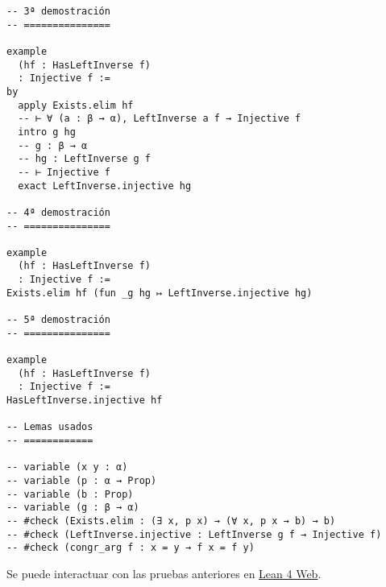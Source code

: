 \begin{verbatim}
-- 3ª demostración
-- ===============

example
  (hf : HasLeftInverse f)
  : Injective f :=
by
  apply Exists.elim hf
  -- ⊢ ∀ (a : β → α), LeftInverse a f → Injective f
  intro g hg
  -- g : β → α
  -- hg : LeftInverse g f
  -- ⊢ Injective f
  exact LeftInverse.injective hg

-- 4ª demostración
-- ===============

example
  (hf : HasLeftInverse f)
  : Injective f :=
Exists.elim hf (fun _g hg ↦ LeftInverse.injective hg)

-- 5ª demostración
-- ===============

example
  (hf : HasLeftInverse f)
  : Injective f :=
HasLeftInverse.injective hf

-- Lemas usados
-- ============

-- variable (x y : α)
-- variable (p : α → Prop)
-- variable (b : Prop)
-- variable (g : β → α)
-- #check (Exists.elim : (∃ x, p x) → (∀ x, p x → b) → b)
-- #check (LeftInverse.injective : LeftInverse g f → Injective f)
-- #check (congr_arg f : x = y → f x = f y)
\end{verbatim}
Se puede interactuar con las pruebas anteriores en \href{https://lean.math.hhu.de/\#url=https://raw.githubusercontent.com/jaalonso/Calculemus2/main/src/Las\_funciones\_con\_inversa\_por\_la\_izquierda\_son\_inyectivas.lean}{Lean 4 Web}.

